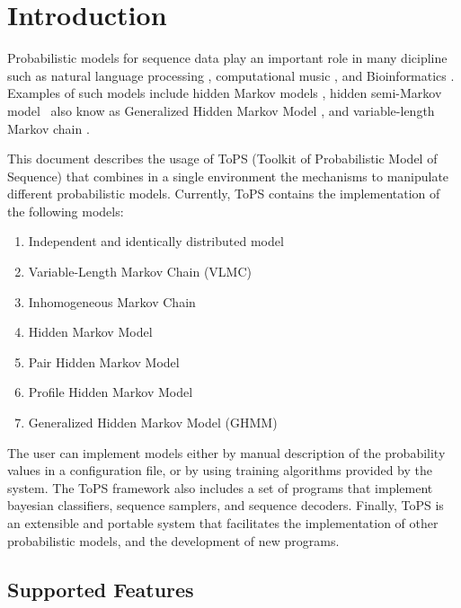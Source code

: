 \chapter{Introduction}

Probabilistic models for sequence data play an important role in many dicipline  such as natural language processing \cite{Manning1999}, computational music \cite{Klapuri2006}, and Bioinformatics \cite{Durbin1998}.  Examples of such models include hidden Markov models \cite{Rabiner1989}, hidden semi-Markov model~\cite{Guedon2003} also know as Generalized Hidden Markov Model \cite{Kulp1996,Burge1997}, and variable-length Markov chain \cite{Rissanen1983}. 

This document describes the usage of ToPS (Toolkit of Probabilistic Model of Sequence) that combines in a single environment the mechanisms to manipulate different probabilistic models. Currently, ToPS contains the implementation of the following models:

\begin{enumerate}
\item Independent and identically distributed model
\item Variable-Length Markov Chain (VLMC)
\item Inhomogeneous Markov Chain
\item Hidden Markov Model
\item Pair Hidden Markov Model
\item Profile Hidden Markov Model
\item Generalized Hidden Markov Model (GHMM)
\end{enumerate}

The user can implement models either by manual description of the probability values in a configuration file, or by using training algorithms provided by the system. The ToPS framework also includes a set of programs that implement bayesian classifiers, sequence samplers, and sequence decoders. Finally, ToPS is an extensible and portable system that facilitates the implementation of other probabilistic models, and the development of new programs.


\section{Supported Features}

